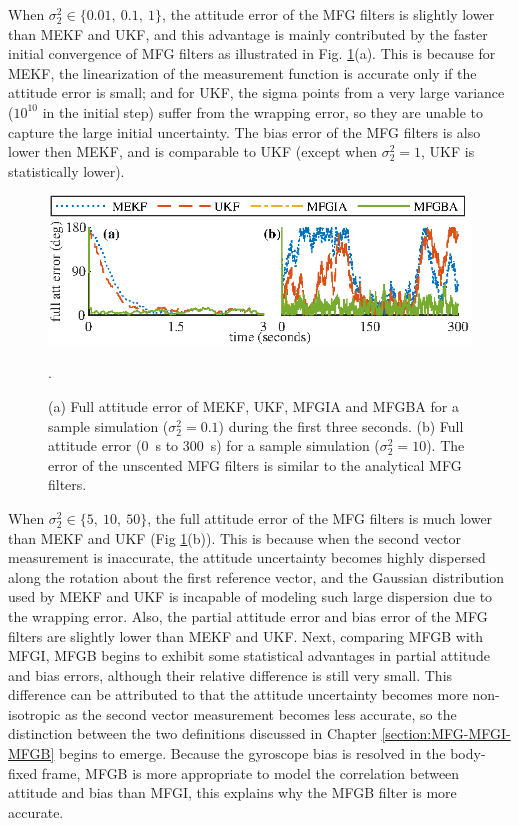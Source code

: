 When $\sigma_2^2 \in \{0.01,\ 0.1,\ 1\}$, the attitude error of the MFG filters is slightly lower than MEKF and UKF, and this advantage is mainly contributed by the faster initial convergence of MFG filters as illustrated in Fig. \ref{fig:attEst-sim2-trajectory-att}(a).
This is because for MEKF, the linearization of the measurement function is accurate only if the attitude error is small; and for UKF, the sigma points from a very large variance ($10^{10}$ in the initial step) suffer from the wrapping error, so they are unable to capture the large initial uncertainty.
The bias error of the MFG filters is also lower then MEKF, and is comparable to UKF (except when $\sigma_2^2=1$, UKF is statistically lower).

\begin{figure}
	\centering
	\includegraphics[scale=1.4]{figures/attEst-sim2-trajectory-att}
	\caption[Full attitude error for example simulations.]{(a) Full attitude error of MEKF, UKF, MFGIA and MFGBA for a sample simulation ($\sigma_2^2 = 0.1$) during the first three seconds.
		(b) Full attitude error (\SI{0}{\second} to \SI{300}{\second}) for a sample simulation ($\sigma_2^2 = 10$).
		The error of the unscented MFG filters is similar to the analytical MFG filters. \label{fig:attEst-sim2-trajectory-att}}.
\end{figure}

When $\sigma_2^2 \in \{5,\ 10,\ 50\}$, the full attitude error of the MFG filters is much lower than MEKF and UKF (Fig \ref{fig:attEst-sim2-trajectory-att}(b)).
This is because when the second vector measurement is inaccurate, the attitude uncertainty becomes highly dispersed along the rotation about the first reference vector, and the Gaussian distribution used by MEKF and UKF is incapable of modeling such large dispersion due to the wrapping error.
Also, the partial attitude error and bias error of the MFG filters are slightly lower than MEKF and UKF.
Next, comparing MFGB with MFGI, MFGB begins to exhibit some statistical advantages in partial attitude and bias errors, although their relative difference is still very small.
This difference can be attributed to that the attitude uncertainty becomes more non-isotropic as the second vector measurement becomes less accurate, so the distinction between the two definitions discussed in Chapter \ref{section:MFG-MFGI-MFGB} begins to emerge.
Because the gyroscope bias is resolved in the body-fixed frame, MFGB is more appropriate to model the correlation between attitude and bias than MFGI, this explains why the MFGB filter is more accurate.

